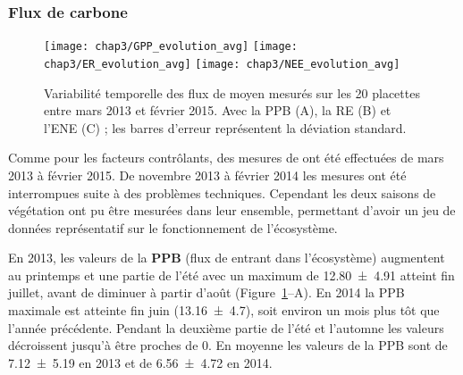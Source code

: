 


\subsubsection{Flux de carbone}

\begin{figure}
	\centering
	\texttt{[image: chap3/GPP\_evolution\_avg]}
	\texttt{[image: chap3/ER\_evolution\_avg]}
	\texttt{[image: chap3/NEE\_evolution\_avg]}
\caption{Variabilité temporelle des flux de \coo moyen mesurés sur les 20 placettes entre mars 2013 et février 2015. Avec la PPB (A), la RE (B) et l'ENE (C) ; les barres d'erreur représentent la déviation standard.}
\label{fig:flux_evolution_avg}
\end{figure}

Comme pour les facteurs contrôlants, des mesures de \coo ont été effectuées de mars 2013 à février 2015.
De novembre 2013 à février 2014 les mesures ont été interrompues suite à des problèmes techniques.
Cependant les deux saisons de végétation ont pu être mesurées dans leur ensemble, permettant d'avoir un jeu de données représentatif sur le fonctionnement de l'écosystème.

En 2013, les valeurs de la \textbf{PPB} (flux de \coo entrant dans l'écosystème) augmentent au printemps et une partie de l'été avec un maximum de \SI{12.80(491)}{\uml} atteint fin juillet, avant de diminuer à partir d'août (Figure~\ref{fig:flux_evolution_avg}--A).
En 2014 la PPB maximale est atteinte fin juin (\SI{13.16(470)}{\uml}), soit environ un mois plus tôt que l'année précédente.
Pendant la deuxième partie de l'été et l'automne les valeurs décroissent jusqu'à être proches de 0.
En moyenne les valeurs de la PPB sont de \SI{7.12(519)}{\uml} en 2013 et de \SI{6.56(472)}{\uml} en 2014.

